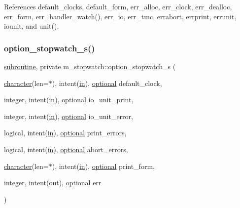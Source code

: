 References default\+\_\+clocks, default\+\_\+form, err\+\_\+alloc, err\+\_\+clock, err\+\_\+dealloc, err\+\_\+form, err\+\_\+handler\+\_\+watch(), err\+\_\+io, err\+\_\+tmc, errabort, errprint, errunit, iounit, and unit().

\mbox{\label{namespacem__stopwatch_a9667f04e61746b7d2b74e9de0d707af0}} 
\subsubsection{\texorpdfstring{option\+\_\+stopwatch\+\_\+s()}{option\_stopwatch\_s()}}
{\footnotesize\ttfamily \hyperlink{M__stopwatch_83_8txt_acfbcff50169d691ff02d4a123ed70482}{subroutine}, private m\+\_\+stopwatch\+::option\+\_\+stopwatch\+\_\+s (\begin{DoxyParamCaption}\item[{\hyperlink{option__stopwatch_83_8txt_abd4b21fbbd175834027b5224bfe97e66}{character}(len=$\ast$), intent(\hyperlink{M__journal_83_8txt_afce72651d1eed785a2132bee863b2f38}{in}), \hyperlink{option__stopwatch_83_8txt_aa4ece75e7acf58a4843f70fe18c3ade5}{optional}}]{default\+\_\+clock,  }\item[{integer, intent(\hyperlink{M__journal_83_8txt_afce72651d1eed785a2132bee863b2f38}{in}), \hyperlink{option__stopwatch_83_8txt_aa4ece75e7acf58a4843f70fe18c3ade5}{optional}}]{io\+\_\+unit\+\_\+print,  }\item[{integer, intent(\hyperlink{M__journal_83_8txt_afce72651d1eed785a2132bee863b2f38}{in}), \hyperlink{option__stopwatch_83_8txt_aa4ece75e7acf58a4843f70fe18c3ade5}{optional}}]{io\+\_\+unit\+\_\+error,  }\item[{logical, intent(\hyperlink{M__journal_83_8txt_afce72651d1eed785a2132bee863b2f38}{in}), \hyperlink{option__stopwatch_83_8txt_aa4ece75e7acf58a4843f70fe18c3ade5}{optional}}]{print\+\_\+errors,  }\item[{logical, intent(\hyperlink{M__journal_83_8txt_afce72651d1eed785a2132bee863b2f38}{in}), \hyperlink{option__stopwatch_83_8txt_aa4ece75e7acf58a4843f70fe18c3ade5}{optional}}]{abort\+\_\+errors,  }\item[{\hyperlink{option__stopwatch_83_8txt_abd4b21fbbd175834027b5224bfe97e66}{character}(len=$\ast$), intent(\hyperlink{M__journal_83_8txt_afce72651d1eed785a2132bee863b2f38}{in}), \hyperlink{option__stopwatch_83_8txt_aa4ece75e7acf58a4843f70fe18c3ade5}{optional}}]{print\+\_\+form,  }\item[{integer, intent(out), \hyperlink{option__stopwatch_83_8txt_aa4ece75e7acf58a4843f70fe18c3ade5}{optional}}]{err }\end{DoxyParamCaption})\hspace{0.3cm}{\ttfamily [private]}}




